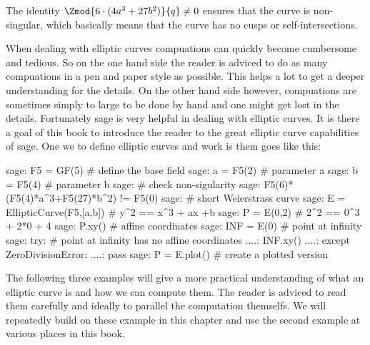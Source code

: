 The identity $\Zmod{6\cdot(4a^3+ 27b^2)}{q}\neq 0$ ensures that the curve is  non-singular, which basically means that the curve has no cusps or self-intersections.

When dealing with elliptic curves compuations can quickly become cumbersome and tedious. So on the one hand side the reader is adviced to do as many compuations in a pen and paper style as possible. This helps a lot to get a deeper understanding for the details. On the other hand side however, compuations are sometimes simply to large to be done by hand and one might get lost in the details. Fortunately sage is very helpful in dealing with elliptic curves. It is there a goal of this book to introduce the reader to the great elliptic curve capabilities of sage. One we to define elliptic curves and work is them goes like this:
\begin{sagecommandline}
sage: F5 = GF(5) # define the base field
sage: a = F5(2) # parameter a
sage: b = F5(4) # parameter b
sage: # check non-sigularity
sage: F5(6)*(F5(4)*a^3+F5(27)*b^2) != F5(0)
sage: # short Weierstrass curve 
sage: E = EllipticCurve(F5,[a,b]) # y^2 == x^3 + ax +b 
sage: P = E(0,2) # 2^2 == 0^3 + 2*0 + 4
sage: P.xy() # affine coordinates
sage: INF = E(0) # point at infinity
sage: try: 	# point at infinity has no affine coordinates
....:     INF.xy()
....: except ZeroDivisionError:
....:     pass
sage: P = E.plot() # create a plotted version 
\end{sagecommandline}
The following three examples will give a more practical understanding of what an elliptic curve is and how we can compute them. The reader is adviced to read them carefully and ideally to parallel the computation themselfs. We will repeatedly build on these example in this chapter and use the second example at various places in this book.
